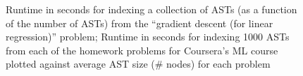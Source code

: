 \begin{figure}[t!]
\center
{}

\caption[Runtime of AST indexing]{ Runtime in seconds for indexing a collection of ASTs (as a function of the number of ASTs)
from the ``gradient descent (for linear regression)'' problem;
 Runtime in seconds for indexing 1000 ASTs from each of the homework problems for Coursera's ML course plotted
against average AST size (\# nodes) for each problem}
\end{figure}
